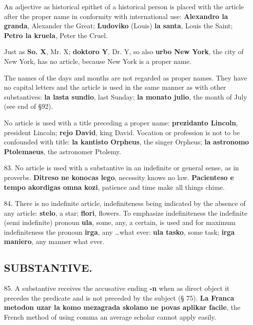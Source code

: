 An adjective as historical epithet of a historical person is placed with the article after the proper name in conformity with international use: \textbf{Alexandro la granda}, Alexander the Great; \textbf{Ludoviko} (Louis) \textbf{la santa}, Louis the Saint; \textbf{Petro la kruela}, Peter the Cruel. 

Just as \textbf{So. X}, Mr. X; \textbf{doktoro Y}, Dr. Y, so also \textbf{urbo New York}, the city of New York, has no article, because New York is a proper name. 

The names of the days and months are not regarded as proper names. They have no capital letters and the article is used in the same manner as with other substantives: \textbf{la lasta sundio}, last Sunday; \textbf{la monato julio}, the month of July (see end of §92). 

No article is used with a title preceding a proper name: \textbf{prezidanto Lincoln}, president Lincoln; \textbf{rejo David}, king David. Vocation or profession is not to be confounded with title: \textbf{la kantisto Orpheus}, the singer Orpheus; \textbf{la astronomo Ptolemaeus}, the astronomer Ptolemy. 

83. No article is used with a substantive in an indefinite or general sense, as in proverbs. \textbf{Ditreso ne konocas lego}, necessity knows no law. \textbf{Pacienteso e tempo akordigas omna kozi}, patience and time make all things chime. 

84. There is no indefinite article, indefiniteness being indicated by the absence of any article: \textbf{stelo}, a star; \textbf{flori}, flowers. To emphasize indefiniteness the indefinite (semi indefinite) pronoun \textbf{ula}, some, any, a certain, is used and for maximum indefiniteness the pronoun \textbf{irga}, any \ldots what ever: \textbf{ula tasko}, some task; \textbf{irga maniero}, any manner what ever.

\subsection*{SUBSTANTIVE.}
85. A substantive receives the accusative ending \textbf{-n} when as direct object it precedes the predicate and is not preceded by the subject (§ 75). \textbf{La Franca metodon uzar la komo mezagrada skolano ne povas aplikar facile}, the French method of using comma an average scholar cannot apply easily. 

